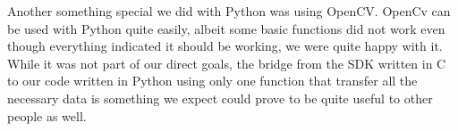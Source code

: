 Another something special we did with Python was using OpenCV. OpenCv can be used with Python quite easily, albeit some basic functions did not work even though everything
indicated it should be working, we were quite happy with it. \\

While it was not part of our direct goals, the bridge from the SDK written in C to our code written in Python using only one function that transfer all the necessary
data is something we expect could prove to be quite useful to other people as well. 


























